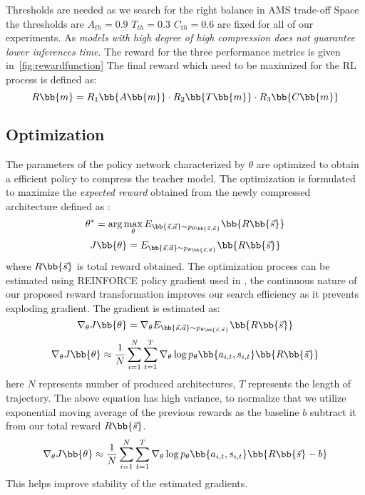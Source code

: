 \documentclass[../main]{subfiles}
\begin{document}
        Thresholds are needed as we search for the right balance in AMS trade-off Space the thresholds are $A_{th} = 0.9 $ $T_{th} = 0.3 $ $C_{th} = 0.6 $ are fixed for all of our experiments.
        As \textit{models with high degree of high compression does not guarantee lower inferences time}. The reward for the three performance metrics is given in~\ref{fig:rewardfunction}
        The final reward which need to be maximized for the RL process is defined as:
        \begin{equation}
        R \bb{m} = R_1 \bb{A\bb{m}}\cdot R_2 \bb{T\bb{m}} \cdot R_3 \bb{C\bb{m}}
        \end{equation}

        
    \subsection{Optimization}
        The parameters of the policy network characterized by $\theta$ are optimized to obtain a efficient policy to compress the teacher model.
        The optimization is formulated to maximize the \textit{expected reward} obtained from the newly compressed architecture defined as :
        \begin{equation}
            \theta^{*} = \arg \max_{\theta} E_{\bb{\Vec{s}, \Vec{a}} \sim p_{\theta\bb{\Vec{s}, \Vec{a}}}} \bb{R\bb{\Vec{s}}}
        \end{equation}
        \begin{equation} 
            J \bb{\theta} = E_{\bb{\Vec{s}, \Vec{a}} \sim p_{\theta\bb{\Vec{s}, \Vec{a}}}} \bb{R\bb{\Vec{s}}}
        \end{equation}
        where $R\bb{\Vec{s}}$ is total reward obtained.
        The optimization process can be estimated using REINFORCE policy gradient used in \cite{williams1992simple}, the continuous nature of our proposed reward transformation improves our search efficiency as it prevents exploding gradient.
        The gradient is estimated as:
        \begin{equation}
            \nabla_{\theta}  J \bb{\theta} = \nabla_{\theta} E_{\bb{\Vec{s}, \Vec{a}} \sim p_{\theta\bb{\Vec{s}, \Vec{a}}}} \bb{R\bb{\Vec{s}}}
        \end{equation}
        \begin{equation}
             \nabla_{\theta}  J \bb{\theta} \approx \frac{1}{N} \sum_{i = 1}^{N} \sum_{t = 1}^{T} \nabla_{\theta} \log{p_{\theta}\bb{a_{i,t}, s_{i,t}}} \bb{R\bb{\Vec{s}}}
        \end{equation}
        here $N$ represents number of produced architectures, $T$ represents the length of trajectory.
        The above equation has high variance, to normalize that we  utilize exponential moving average of the previous rewards as the baseline $b$ subtract it from our total reward $R\bb{\Vec{s}}$.
        \begin{equation}
             \nabla_{\theta}  J \bb{\theta} \approx \frac{1}{N} \sum_{i = 1}^{N} \sum_{t = 1}^{T} \nabla_{\theta} \log{p_{\theta}\bb{a_{i,t}, s_{i,t}}} \bb{R\bb{\Vec{s}} - b}
        \end{equation}
        This helps improve stability of the estimated gradients.
\end{document}

